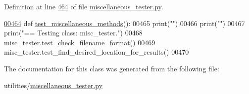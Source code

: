 Definition at line \hyperlink{miscellaneous__tester_8py_source_l00464}{464} of file \hyperlink{miscellaneous__tester_8py_source}{miscellaneous\+\_\+tester.\+py}.


\begin{DoxyCode}
\hypertarget{classutilities_1_1miscellaneous__tester_1_1misc__tester_l00464}{}\hyperlink{classutilities_1_1miscellaneous__tester_1_1misc__tester_a8a269b66a82f93ee9683ebbf8974ba24}{00464}     \textcolor{keyword}{def }\hyperlink{classutilities_1_1miscellaneous__tester_1_1misc__tester_a8a269b66a82f93ee9683ebbf8974ba24}{test\_miscellaneous\_methods}():
00465         print(\textcolor{stringliteral}{""})
00466         print(\textcolor{stringliteral}{""})
00467         print(\textcolor{stringliteral}{"==   Testing class: misc\_tester."})
00468         misc\_tester.test\_check\_filename\_format()
00469         misc\_tester.test\_find\_desired\_location\_for\_results()
00470 \end{DoxyCode}


The documentation for this class was generated from the following file\+:\begin{DoxyCompactItemize}
\item 
utilities/\hyperlink{miscellaneous__tester_8py}{miscellaneous\+\_\+tester.\+py}\end{DoxyCompactItemize}
